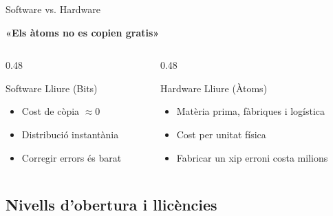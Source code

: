 \documentclass[catalan]{beamer}
\begin{document}
\begin{frame}{Software vs. Hardware}
  \begin{center}
    \Large \textbf{«Els àtoms no es copien gratis»}
  \end{center}
  \vspace{0.3cm}
  \begin{columns}[T]
    \begin{column}{0.48\textwidth}
      \begin{block}{Software Lliure (Bits)}
        \begin{itemize}
          \item Cost de còpia $\approx 0$
          \item Distribució instantània
          \item Corregir errors és barat
        \end{itemize}
      \end{block}
    \end{column}
    \pause
    \begin{column}{0.48\textwidth}
      \begin{alertblock}{Hardware Lliure (Àtoms)}
        \begin{itemize}
          \item Matèria prima, fàbriques i logística
          \item Cost per unitat física
          \item Fabricar un xip erroni costa milions
        \end{itemize}
      \end{alertblock}
    \end{column}
  \end{columns}
\end{frame}

\subsection{Nivells d'obertura i llicències}
\end{document}

